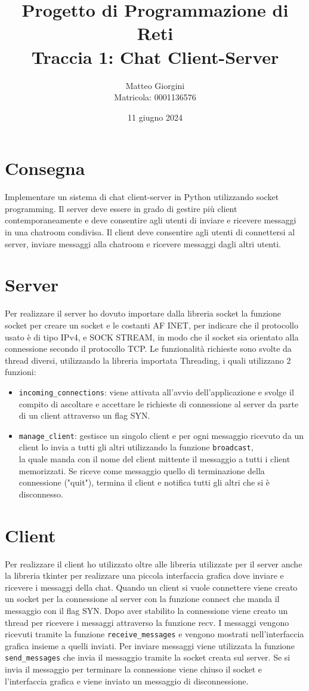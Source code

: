 \documentclass[a4paper,12pt]{report}
\title{Progetto di Programmazione di Reti 
    \\ Traccia 1: Chat Client-Server}
\author{Matteo Giorgini \\ Matricola: 0001136576}
\date{11 giugno 2024}
\begin{document}
\maketitle
\tableofcontents
\chapter{Consegna}
Implementare un sistema di chat client-server in Python utilizzando socket programming. 
Il server deve essere in grado di gestire più client contemporaneamente e deve consentire agli utenti di inviare e ricevere messaggi in una chatroom condivisa. 
Il client deve consentire agli utenti di connettersi al server, inviare messaggi alla chatroom e ricevere messaggi dagli altri utenti.
\chapter{Server}
Per realizzare il server ho dovuto importare dalla libreria socket la funzione socket per creare un socket e le costanti AF INET, 
per indicare che il protocollo usato è di tipo IPv4, e SOCK STREAM, in modo che il socket sia orientato alla connessione secondo il protocollo TCP.
Le funzionalità richieste sono svolte da thread diversi, utilizzando la libreria importata Threading, i quali utilizzano 2 funzioni:
\begin{itemize}
    \item \texttt{incoming\_connections}: viene attivata all'avvio dell'applicazione e svolge il compito di ascoltare e accettare le richieste di connessione al server da parte di un client attraverso un flag SYN.
    \item \texttt{manage\_client}: gestisce un singolo client e per ogni messaggio ricevuto da un client lo invia a tutti gli altri utilizzando la funzione \texttt{broadcast},
    \\ la quale manda con il nome del client mittente il messaggio a tutti i client memorizzati. Se riceve come messaggio quello di terminazione della connessione ("{quit}"), termina il client e notifica tutti gli altri che si è disconnesso.
\end{itemize}
\chapter{Client}
Per realizzare il client ho utilizzato oltre alle libreria utilizzate per il server anche la libreria tkinter per realizzare una piccola interfaccia grafica dove inviare e ricevere i messaggi della chat. 
Quando un client si vuole connettere viene creato un socket per la connessione al server con la funzione connect che manda il messaggio con il flag SYN. Dopo aver stabilito la connessione viene creato un thread per ricevere i messaggi attraverso la funzione recv. 
I messaggi vengono ricevuti tramite la funzione \texttt{receive\_messages} e vengono mostrati nell'interfaccia grafica insieme a quelli inviati. 
Per inviare messaggi viene utilizzata la funzione \texttt{send\_messages} che invia il messaggio tramite la socket creata sul server. 
Se si invia il messaggio per terminare la connessione viene chiuso il socket e l'interfaccia grafica e viene inviato un messaggio di disconnessione.
\end{document}
